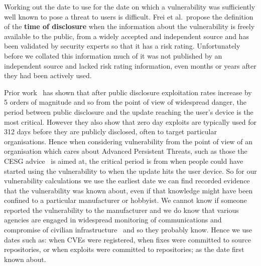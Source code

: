 \documentclass[conference,a4paper,twoside]{IEEEtran}
\begin{document}
Working out the date to use for the date on which a vulnerability was sufficiently well known to pose a threat to users is difficult.
Frei et al.\ propose the definition of the {\bf time of disclosure} when the information about the vulnerability is freely available to the public, from a widely accepted and independent source and has been validated by security experts so that it has a risk rating.
Unfortunately before we collated this information much of it was not published by an independent source and lacked risk rating information, even months or years after they had been actively used.

Prior work~\cite{Bilge2012} has shown that after public disclosure exploitation rates increase by 5 orders of magnitude and so from the point of view of widespread danger, the period between public disclosure and the update reaching the user's device is the most critical.
However they also show that zero day exploits are typically used for 312 days before they are publicly disclosed, often to target particular organisations.
Hence when considering vulnerability from the point of view of an organisation which cares about Advanced Persistent Threats, such as those the CESG advice~\cite{CESG2013} is aimed at, the critical period is from when people could have started using the vulnerability to when the update hits the user device.
So for our vulnerability calculations we use the earliest date we can find recorded evidence that the vulnerability was known about, even if that knowledge might have been confined to a particular manufacturer or hobbyist.
We cannot know if someone reported the vulnerability to the manufacturer and we do know that various agencies are engaged in widespread monitoring of communications and compromise of civilian infrastructure~\cite{TODO} and so they probably know.
Hence we use dates such as: when CVEs were registered, when fixes were committed to source repositories, or when exploits were committed to repositories; as the date first known about.

\daTabAndVulns
\end{document}
